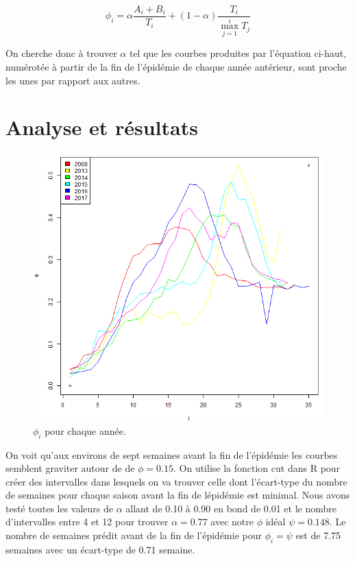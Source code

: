 \documentclass[12pt]{article}
\begin{document}
\[ \phi_i = \alpha\frac{A_i+B_i}{T_i} + (1-\alpha)\frac{T_i}{\max_{j=1}^i T_j} \]

On cherche donc \`a trouver $\alpha$ tel que les courbes produites par l'\'equation ci-haut, num\'erot\'ee \`a partir de la fin de l'\'epid\'emie de chaque ann\'ee ant\'erieur,
sont proche les unes par rapport aux autres.

\section{Analyse et r\'esultats}
\begin{figure}[h]
    \centering
    \includegraphics[width=5.5in]{PhiParAnnee.png}
    \caption{$\phi_i$ pour chaque ann\'ee.}
\end{figure}

On voit qu'aux environs de sept semaines avant la fin de l'\'epid\'emie les courbes semblent graviter autour de de $\phi = 0.15$. On utilise la fonction cut
dans R\cite{R}
pour cr\'eer des intervalles dans lesquels on va trouver celle dont l'\'ecart-type du nombre de semaines pour chaque saison avant la fin de l\'epid\'emie est minimal. Nous avons
test\'e toutes les valeurs de $\alpha$ allant de 0.10 \`a 0.90 en bond de 0.01 et le nombre d'intervalles entre 4 et 12 pour trouver $\alpha = 0.77$ avec notre $\phi$ id\'eal $\psi = 0.148$.
Le nombre de semaines pr\'edit avant de la fin de l'\'epid\'emie pour $\phi_i = \psi$ est de 7.75 semaines avec un \'ecart-type de 0.71 semaine.
\end{document}
